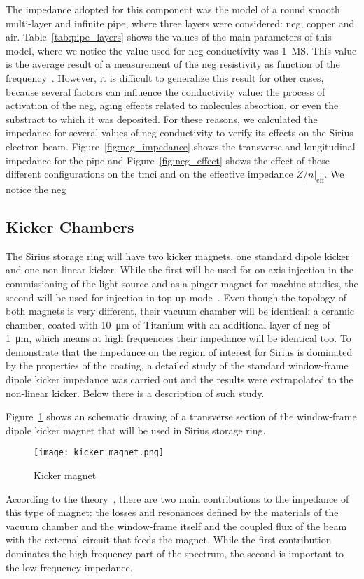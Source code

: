     The impedance adopted for this component was the model of a round smooth multi-layer and infinite pipe, where three layers were considered: \gls{neg}, copper and air. Table~\ref{tab:pipe_layers} shows the values of the main parameters of this model, where we notice the value used for \gls{neg} conductivity was \SI{1}{\mega\siemens}. This value is the average result of a measurement of the \gls{neg} resistivity as function of the frequency~\cite{NEG_measure}. However, it is difficult to generalize this result for other cases, because several factors can influence the conductivity value: the process of activation of the \gls{neg}, aging effects related to molecules absortion, or even the substract to which it was deposited. For these reasons, we calculated the impedance for several values of \gls{neg} conductivity to verify its effects on the Sirius electron beam. Figure~\ref{fig:neg_impedance} shows the transverse and longitudinal impedance for the pipe and Figure~\ref{fig:neg_effect} shows the effect of these different configurations on the \gls{tmci} and on the effective impedance $Z/n|_\text{eff}$. We notice the \gls{neg}

\subsection{Kicker Chambers}

    The Sirius storage ring will have two kicker magnets, one standard dipole kicker and one non-linear kicker. While the first will be used for on-axis injection in the commissioning of the light source and as a pinger magnet for machine studies, the second will be used for injection in top-up mode~\cite{SiriusInjection}. Even though the topology of both magnets is very different, their vacuum chamber will be identical: a ceramic chamber, coated with \SI{10}{\micro\meter} of Titanium with an additional layer of \gls{neg} of \SI{1}{\micro\meter}, which means at high frequencies their impedance will be identical too. To demonstrate that the impedance on the region of interest for Sirius is dominated by the properties of the coating, a detailed study of the standard window-frame dipole kicker impedance was carried out and the results were extrapolated to the non-linear kicker. Below there is a description of such study.

    Figure~\ref{fig:kicker_magnet} shows an schematic drawing of a transverse section of the window-frame dipole kicker magnet that will be used in Sirius storage ring.
    \begin{figure}[b!]
        \centering
        \texttt{[image: kicker\_magnet.png]}
        \caption{Kicker magnet}
        \label{fig:kicker_magnet}
    \end{figure}
    According to the theory~\cite{Nassibian1979,Davino2003}, there are two main contributions to the impedance of this type of magnet: the losses and resonances defined by the materials of the vacuum chamber and the window-frame itself and the coupled flux of the beam with the external circuit that feeds the magnet. While the first contribution dominates the high frequency part of the spectrum, the second is important to the low frequency impedance.

